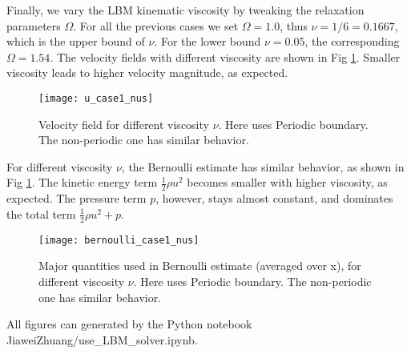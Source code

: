 \begin{solution} 

Finally, we vary the LBM kinematic viscosity by tweaking the relaxation parameters $\Omega$. For all the previous cases we set $\Omega=1.0$, thus $\nu=1/6=0.1667$, which is the upper bound of $\nu$. For the lower bound $\nu=0.05$, the corresponding $\Omega = 1.54$. The velocity fields with different viscosity are shown in Fig \ref{fig:u_case1_nus}. Smaller viscosity leads to higher velocity magnitude, as expected.

\begin{figure}[H]
\texttt{[image: u\_case1\_nus]}
\centering
\caption{Velocity field for different viscosity $\nu$. Here uses Periodic boundary. The non-periodic one has similar behavior.}
\label{fig:u_case1_nus}
\end{figure}

For different viscosity $\nu$, the Bernoulli estimate has similar behavior, as shown in Fig \ref{fig:u_case1_nus}. The kinetic energy term $\frac{1}{2} \rho u^2$ becomes smaller with higher viscosity, as expected. The pressure term $p$, however, stays almost constant, and dominates the total term $\frac{1}{2} \rho u^2 + p$.

\begin{figure}[H]
\texttt{[image: bernoulli\_case1\_nus]}
\centering
\caption{Major quantities used in Bernoulli estimate (averaged over x), for different viscosity $\nu$. Here uses Periodic boundary. The non-periodic one has similar behavior.}
\label{fig:bernoulli_case1_nus}
\end{figure}

\end{solution}


\begin{solution} 

All figures can generated by the Python notebook JiaweiZhuang/use\_LBM\_solver.ipynb.

\end{solution}